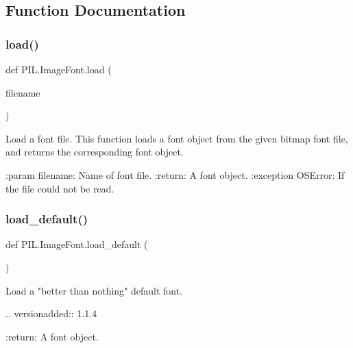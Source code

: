 \subsection{Function Documentation}
\mbox{\label{namespacePIL_1_1ImageFont_adef18079ea6c0d45a068d08604479f9c}} 
\subsubsection{\texorpdfstring{load()}{load()}}
{\footnotesize\ttfamily def P\+I\+L.\+Image\+Font.\+load (\begin{DoxyParamCaption}\item[{}]{filename }\end{DoxyParamCaption})}

\begin{DoxyVerb}Load a font file.  This function loads a font object from the given
bitmap font file, and returns the corresponding font object.

:param filename: Name of font file.
:return: A font object.
:exception OSError: If the file could not be read.
\end{DoxyVerb}
 \mbox{\label{namespacePIL_1_1ImageFont_a57385d8868c8ea8d060d02cfe33c5592}} 
\subsubsection{\texorpdfstring{load\+\_\+default()}{load\_default()}}
{\footnotesize\ttfamily def P\+I\+L.\+Image\+Font.\+load\+\_\+default (\begin{DoxyParamCaption}{ }\end{DoxyParamCaption})}

\begin{DoxyVerb}Load a "better than nothing" default font.

.. versionadded:: 1.1.4

:return: A font object.
\end{DoxyVerb}
 \mbox{\label{namespacePIL_1_1ImageFont_ad50580641e55bb15562c963d37d4836e}} 
